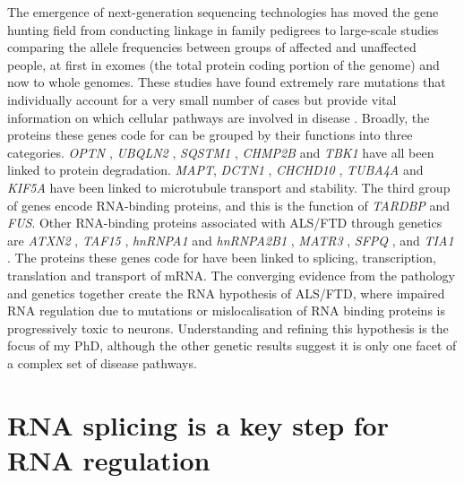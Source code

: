 The emergence of next-generation sequencing technologies has moved the gene hunting field from conducting linkage in family pedigrees to large-scale studies comparing the allele frequencies between groups of affected and unaffected people, at first in exomes (the total protein coding portion of the genome) and now to whole genomes. 
These studies have found extremely rare mutations that individually account for a very small number of cases but provide vital information on which cellular pathways are involved in disease  \citep{Taylor2016,Pottier2016}.
Broadly, the proteins these genes code for can be grouped by their functions into three categories. 
\textit{OPTN} \citep{Maruyama2010} , \textit{UBQLN2} \citep{Deng2011}, \textit{SQSTM1} \citep{Fecto2011}, \textit{CHMP2B} \citep{Skibinski2005} and \textit{TBK1} \citep{Cirulli2015,Freischmidt2015} have all been linked to protein degradation. 
\textit{MAPT}, \textit{DCTN1} \citep{Puls2003} , \textit{CHCHD10} \citep{Bannwarth2014}, \textit{TUBA4A} \citep{Smith2014} and \textit{KIF5A} \citep{Nicolas2018} have been linked to microtubule transport and stability. 
The third group of genes encode RNA-binding proteins, and this is the function of \textit{TARDBP} and \textit{FUS}. 
Other RNA-binding proteins associated with ALS/FTD through genetics are \textit{ATXN2} \citep{Elden2010}, \textit{TAF15} \citep{Ticozzi2011}, \textit{hnRNPA1} and \textit{hnRNPA2B1} \citep{Kim2013}, \textit{MATR3} \citep{Johnson2014}, \textit{SFPQ} \citep{Thomas-Jinu2017}, and \textit{TIA1} \citep{Mackenzie2017}. 
The proteins these genes code for have been linked to splicing, transcription, translation and transport of mRNA. 
The converging evidence from the pathology and genetics together create the RNA hypothesis of ALS/FTD, where impaired RNA regulation due to mutations or mislocalisation of RNA binding proteins is progressively toxic to neurons. 
Understanding and refining this hypothesis is the focus of my PhD, although the other genetic results suggest it is only one facet of a complex set of disease pathways. 

\section{RNA splicing is a key step for RNA regulation}

